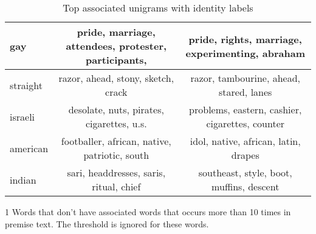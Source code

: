 \documentclass[11pt]{article}
\begin{document}
\begin{table*}
\begin{threeparttable}
\begin{tabular}{l|c|c}
                gay &
                pride,
                marriage,
                attendees,
                protester,
                participants,
                &
                pride,
                rights,
                marriage,
                experimenting,
                abraham
                \\\hline

                straight &
                razor,
                ahead,
                stony,
                sketch,
                crack
                &
                razor,
                tambourine,
                ahead,
                stared,
                lanes
                \\\hline

                israeli &
                desolate,
                nuts,
                pirates,
                cigarettes,
                u.s.
                &
                problems,
                eastern,
                cashier,
                cigarettes,
                counter
                \\\hline

                american &
                footballer,
                african,
                native,
                patriotic,
                south
                &
                idol,
                native,
                african,
                latin,
                drapes
                \\\hline

                indian &
                sari,
                headdresses,
                saris,
                ritual,
                chief
                &
                southeast,
                style,
                boot,
                muffins,
                descent
                \\\hline

            \end{tabular}

            \begin{tablenotes}
                \item[1] Words that don't have associated words that occurs more than 10 times in premise text.
                The threshold is ignored for these words.
            \end{tablenotes}
        \end{threeparttable}

        \caption{Top associated unigrams with identity labels}
        \label{tab:unigram_pmi}
    \end{table*}
\end{document}
